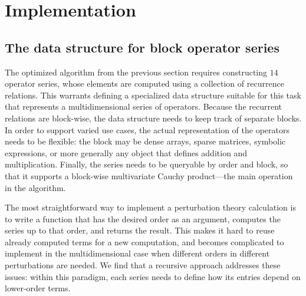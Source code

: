 \section{Implementation}
\label{sec:implementation}

\subsection{The data structure for block operator series}
\label{sec:BlockSeries}

The optimized algorithm from the previous section requires constructing $14$ operator series, whose elements are computed using a collection of recurrence relations.
This warrants defining a specialized data structure suitable for this task that represents a multidimensional series of operators.
Because the recurrent relations are block-wise, the data structure needs to keep track of separate blocks.
In order to support varied use cases, the actual representation of the operators needs to be flexible: the block may be dense arrays, sparse matrices, symbolic expressions, or more generally any object that defines addition and multiplication.
Finally, the series needs to be queryable by order and block, so that it supports a block-wise multivariate Cauchy product---the main operation in the algorithm.

The most straightforward way to implement a perturbation theory calculation is to write a function that has the desired order as an argument, computes the series up to that order, and returns the result.
This makes it hard to reuse already computed terms for a new computation, and becomes complicated to implement in the multidimensional case when different orders in different perturbations are needed.
We find that a recursive approach addresses these issues: within this paradigm, each series needs to define how its entries depend on lower-order terms.

